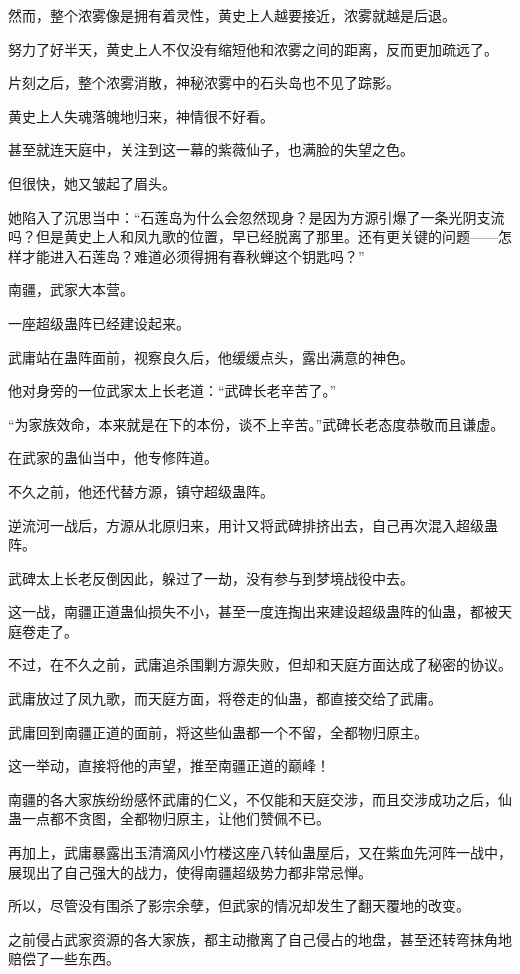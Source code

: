 \begin{this_body}
然而，整个浓雾像是拥有着灵性，黄史上人越要接近，浓雾就越是后退。

努力了好半天，黄史上人不仅没有缩短他和浓雾之间的距离，反而更加疏远了。

片刻之后，整个浓雾消散，神秘浓雾中的石头岛也不见了踪影。

黄史上人失魂落魄地归来，神情很不好看。

甚至就连天庭中，关注到这一幕的紫薇仙子，也满脸的失望之色。

但很快，她又皱起了眉头。

她陷入了沉思当中：“石莲岛为什么会忽然现身？是因为方源引爆了一条光阴支流吗？但是黄史上人和凤九歌的位置，早已经脱离了那里。还有更关键的问题——怎样才能进入石莲岛？难道必须得拥有春秋蝉这个钥匙吗？”

南疆，武家大本营。

一座超级蛊阵已经建设起来。

武庸站在蛊阵面前，视察良久后，他缓缓点头，露出满意的神色。

他对身旁的一位武家太上长老道：“武碑长老辛苦了。”

“为家族效命，本来就是在下的本份，谈不上辛苦。”武碑长老态度恭敬而且谦虚。

在武家的蛊仙当中，他专修阵道。

不久之前，他还代替方源，镇守超级蛊阵。

逆流河一战后，方源从北原归来，用计又将武碑排挤出去，自己再次混入超级蛊阵。

武碑太上长老反倒因此，躲过了一劫，没有参与到梦境战役中去。

这一战，南疆正道蛊仙损失不小，甚至一度连掏出来建设超级蛊阵的仙蛊，都被天庭卷走了。

不过，在不久之前，武庸追杀围剿方源失败，但却和天庭方面达成了秘密的协议。

武庸放过了凤九歌，而天庭方面，将卷走的仙蛊，都直接交给了武庸。

武庸回到南疆正道的面前，将这些仙蛊都一个不留，全都物归原主。

这一举动，直接将他的声望，推至南疆正道的巅峰！

南疆的各大家族纷纷感怀武庸的仁义，不仅能和天庭交涉，而且交涉成功之后，仙蛊一点都不贪图，全都物归原主，让他们赞佩不已。

再加上，武庸暴露出玉清滴风小竹楼这座八转仙蛊屋后，又在紫血先河阵一战中，展现出了自己强大的战力，使得南疆超级势力都非常忌惮。

所以，尽管没有围杀了影宗余孽，但武家的情况却发生了翻天覆地的改变。

之前侵占武家资源的各大家族，都主动撤离了自己侵占的地盘，甚至还转弯抹角地赔偿了一些东西。


\end{this_body}

